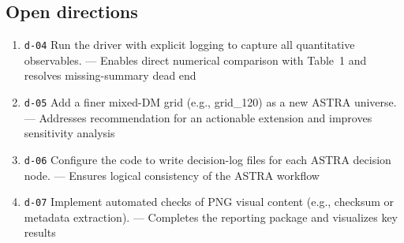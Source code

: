 \documentclass[11pt,a4paper]{article}
\begin{document}
\subsection{Open directions}
\begin{enumerate}
  \item \texttt{d-04} Run the driver with explicit logging to capture all quantitative observables. --- Enables direct numerical comparison with Table~1 and resolves missing-summary dead end
  \item \texttt{d-05} Add a finer mixed-DM grid (e.g., grid\_120) as a new ASTRA universe. --- Addresses recommendation for an actionable extension and improves sensitivity analysis
  \item \texttt{d-06} Configure the code to write decision-log files for each ASTRA decision node. --- Ensures logical consistency of the ASTRA workflow
  \item \texttt{d-07} Implement automated checks of PNG visual content (e.g., checksum or metadata extraction). --- Completes the reporting package and visualizes key results
\end{enumerate}
\end{document}
